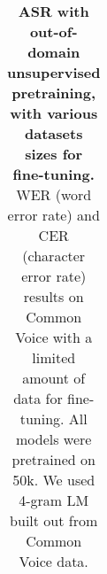 \begin{table}[ht]
\begin{tabular}{c|c|c|cc|cc}
    \bottomrule
    \end{tabular}
    \caption{\textbf{ASR with out-of-domain unsupervised pretraining, with various datasets sizes for fine-tuning.} WER (word error rate) and CER (character error rate) results on Common Voice with a limited amount of data for fine-tuning. All models were pretrained on \vp 50k. We used 4-gram LM built out from Common Voice data.}
    \label{tab:ablation_cv}
\end{table}

